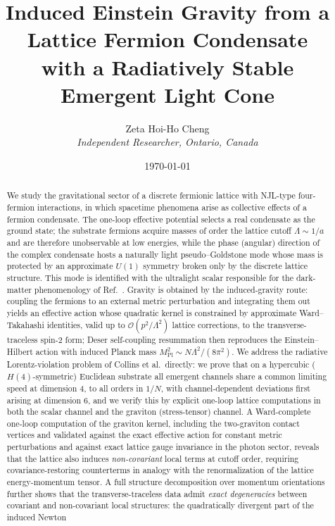 \documentclass[11pt,a4paper]{article}
\title{\textbf{Induced Einstein Gravity from a Lattice Fermion
Condensate \\ with a Radiatively Stable Emergent Light Cone}}
\author{Zeta Hoi-Ho Cheng \\
\textit{Independent Researcher, Ontario, Canada}}
\date{\today}
\begin{document}
\maketitle

\begin{abstract}
We study the gravitational sector of a discrete fermionic lattice
with NJL-type four-fermion interactions, in which spacetime
phenomena arise as collective effects of a fermion condensate.
The one-loop effective potential selects a real condensate as the
ground state; the substrate fermions acquire masses of order the
lattice cutoff $\Lambda \sim 1/a$ and are therefore unobservable
at low energies, while the phase (angular) direction of the complex
condensate hosts a naturally light pseudo--Goldstone mode whose
mass is protected by an approximate $U(1)$ symmetry broken only by
the discrete lattice structure.
This mode is identified with the ultralight scalar responsible for
the dark-matter phenomenology of Ref.~\cite{Cheng:2025sparc}.
Gravity is obtained by the induced-gravity route: coupling the
fermions to an external metric perturbation and integrating them
out yields an effective action whose quadratic kernel is
constrained by approximate Ward--Takahashi identities, valid up to
$\mathcal{O}(p^2/\Lambda^2)$ lattice corrections, to the
transverse-traceless spin-2 form; Deser self-coupling resummation
then reproduces the Einstein--Hilbert action with induced Planck
mass $M_{\mathrm{Pl}}^2 \sim N\Lambda^2/(8\pi^2)$.
We address the radiative Lorentz-violation problem of Collins
et al.\ directly: we prove that on a hypercubic ($H(4)$-symmetric)
Euclidean substrate all emergent channels share a common limiting
speed at dimension 4, to all orders in $1/N$, with
channel-dependent deviations first arising at dimension 6, and we
verify this by explicit one-loop lattice computations in both the
scalar channel and the graviton (stress-tensor) channel.
A Ward-complete one-loop computation of the graviton kernel,
including the two-graviton contact vertices and validated against
the exact effective action for constant metric perturbations and
against exact lattice gauge invariance in the photon sector,
reveals that the lattice also induces \emph{non-covariant} local
terms at cutoff order, requiring covariance-restoring counterterms
in analogy with the renormalization of the lattice energy-momentum
tensor.
A full structure decomposition over momentum orientations further
shows that the transverse-traceless data admit \emph{exact
degeneracies} between covariant and non-covariant local
structures: the quadratically divergent part of the induced Newton

\end{abstract}
\end{document}
